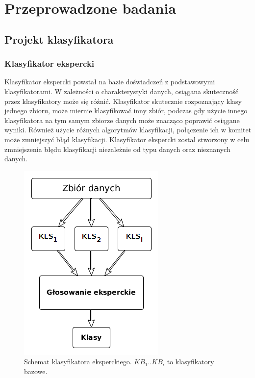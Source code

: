 \chapter{Przeprowadzone badania}
\section{Projekt klasyfikatora}
\subsection{Klasyfikator ekspercki}
Klasyfikator ekspercki powstał na bazie doświadczeń z podstawowymi klasyfikatorami. W zależności o charakterystyki danych, osiągana skuteczność przez klasyfikatory może się różnić. Klasyfikator skutecznie rozpoznający klasy jednego zbioru, może miernie klasyfikować inny zbiór, podczas gdy użycie innego klasyfikatora na tym samym zbiorze danych może znacząco poprawić osiągane wyniki. Również użycie różnych algorytmów klasyfikacji, połączenie ich w komitet może zmniejszyć błąd klasyfikacji. 
Klasyfikator ekspercki został stworzony w celu zmniejszenia błędu klasyfikacji niezależnie od typu danych oraz nieznanych danych. \par
\begin{figure}[h]
	\centering
	\includegraphics[width=\textwidth]{./images/klas_ekspercki.png}
	\caption{Schemat klasyfikatora eksperckiego. $KB_1..KB_i$ to klasyfikatory bazowe.}
	\label{fig:klasyfikator_ekspercki}
\end{figure}

